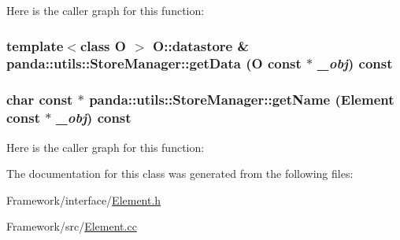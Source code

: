 Here is the caller graph for this function:\hypertarget{classpanda_1_1utils_1_1StoreManager_a6a926a8958407d4c8c14e2fee165f637}{
\subsubsection[{getData}]{\setlength{\rightskip}{0pt plus 5cm}template$<$class O $>$ O::datastore \& panda::utils::StoreManager::getData (O const $\ast$ {\em \_\-obj}) const}}
\label{classpanda_1_1utils_1_1StoreManager_a6a926a8958407d4c8c14e2fee165f637}
\hypertarget{classpanda_1_1utils_1_1StoreManager_acada8d02da4ba8c252b1a0f4c78346aa}{
\subsubsection[{getName}]{\setlength{\rightskip}{0pt plus 5cm}char const $\ast$ panda::utils::StoreManager::getName ({\bf Element} const $\ast$ {\em \_\-obj}) const}}
\label{classpanda_1_1utils_1_1StoreManager_acada8d02da4ba8c252b1a0f4c78346aa}


Here is the caller graph for this function:

The documentation for this class was generated from the following files:\begin{DoxyCompactItemize}
\item 
Framework/interface/\hyperlink{Element_8h}{Element.h}\item 
Framework/src/\hyperlink{Element_8cc}{Element.cc}\end{DoxyCompactItemize}
